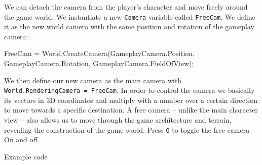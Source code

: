 \documentclass[
  openany]{book}
\newenvironment{Shaded}{\begin{snugshade}}{\end{snugshade}}
\newcommand{\FunctionTok}[1]{\textcolor[rgb]{0.00,0.00,0.00}{#1}}
\newcommand{\NormalTok}[1]{#1}
\begin{document}
We can detach the camera from the player's character and move freely around the game world. We instantiate a new \texttt{Camera} variable called \texttt{FreeCam}. We define it as the new world camera with the same position and rotation of the gameplay camera:

\begin{Shaded}
\begin{Highlighting}[]
\NormalTok{FreeCam = World.}\FunctionTok{CreateCamera}\NormalTok{(GameplayCamera.}\FunctionTok{Position}\NormalTok{, GameplayCamera.}\FunctionTok{Rotation}\NormalTok{, GameplayCamera.}\FunctionTok{FieldOfView}\NormalTok{);}
\end{Highlighting}
\end{Shaded}

We then define our new camera as the main camera with \texttt{World.RenderingCamera\ =\ FreeCam}. In order to control the camera we basically its vectors in 3D coordinates and multiply with a number over a certain direction to move towards a specific destination.
A free camera -- unlike the main character view -- also allows us to move through the game architecture and terrain, revealing the construction of the game world. Press \texttt{O} to toggle the free camera On and off.

Example code
\end{document}
